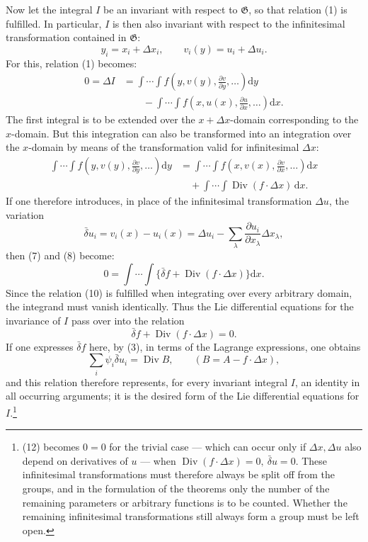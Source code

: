 \documentclass[11pt]{article}
\newcommand{\D}{\Delta}
\providecommand{\dd}{\mathrm d}
\providecommand{\Div}{\operatorname{Div}}
\providecommand{\G}{\mathfrak G}
\providecommand{\bd}{\bar{\delta}}
\providecommand{\p}{\partial}
\providecommand{\p}{\partial}
\providecommand{\dd}{\mathrm d}
\begin{document}
Now let the integral \(I\) be an invariant with respect to \(\G\), so that relation (1) is fulfilled. In particular, \(I\) is then also invariant with respect to the infinitesimal transformation contained in \(\G\):
\[
y_i=x_i+\D x_i,\qquad v_i(y)=u_i+\D u_i.
\]
For this, relation (1) becomes:
\begin{equation}
\begin{aligned}
0=\D I
&=\int\!\cdots\!\int f\!\left(y,v(y),\frac{\p v}{\p y},\ldots\right)\dd y\\
&\qquad-\int\!\cdots\!\int f\!\left(x,u(x),\frac{\p u}{\p x},\ldots\right)\dd x.
\end{aligned}
\tag{7}
\end{equation}
The first integral is to be extended over the \(x+\D x\)-domain corresponding to the \(x\)-domain. But this integration can also be transformed into an integration over the \(x\)-domain by means of the transformation valid for infinitesimal \(\D x\):
\begin{equation}
\begin{aligned}
\int\!\cdots\!\int f\!\left(y,v(y),\frac{\p v}{\p y},\ldots\right)\dd y
&=\int\!\cdots\!\int f\!\left(x,v(x),\frac{\p v}{\p x},\ldots\right)\dd x\\
&\quad+\int\!\cdots\!\int \Div(f\cdot \D x)\,\dd x.
\end{aligned}
\tag{8}
\end{equation}
If one therefore introduces, in place of the infinitesimal transformation \(\D u\), the variation
\begin{equation}
\bd u_i=v_i(x)-u_i(x)=\D u_i-\sum_\lambda\frac{\p u_i}{\p x_\lambda}\D x_\lambda,
\tag{9}
\end{equation}
then (7) and (8) become:
\begin{equation}
0=\int\!\cdots\!\int\{\bd f+\Div(f\cdot\D x)\}\dd x.
\tag{10}
\end{equation}
Since the relation (10) is fulfilled when integrating over every arbitrary domain, the integrand must vanish identically. Thus the Lie differential equations for the invariance of \(I\) pass over into the relation
\begin{equation}
\bd f+\Div(f\cdot\D x)=0.
\tag{11}
\end{equation}
If one expresses \(\bd f\) here, by (3), in terms of the Lagrange expressions, one obtains
\begin{equation}
\sum_i\psi_i\bd u_i=\Div B,\qquad (B=A-f\cdot\D x),
\tag{12}
\end{equation}
and this relation therefore represents, for every invariant integral \(I\), an identity in all occurring arguments; it is the desired form of the Lie differential equations for \(I\).\footnote{(12) becomes \(0=0\) for the trivial case --- which can occur only if \(\D x,\D u\) also depend on derivatives of \(u\) --- when \(\Div(f\cdot\D x)=0,\ \bd u=0\). These infinitesimal transformations must therefore always be split off from the groups, and in the formulation of the theorems only the number of the remaining parameters or arbitrary functions is to be counted. Whether the remaining infinitesimal transformations still always form a group must be left open.}
\end{document}
